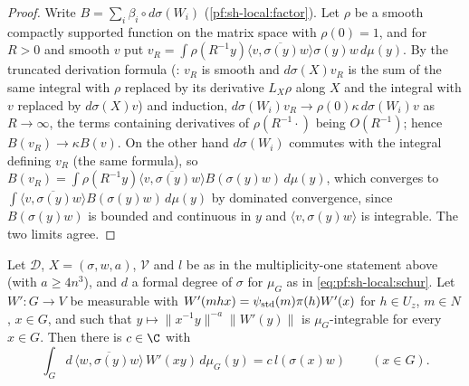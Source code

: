 \begin{proof}
Write $B=\sum_i\beta_i\circ d\sigma(W_i)$ (\cref{pf:sh-local:factor}). Let $\rho$ be a smooth compactly supported
function on the matrix space with $\rho(0)=1$, and for $R>0$ and smooth $v$ put
$v_R=\int\rho(R^{-1}y)\overline{\langle v,\sigma(y)w\rangle}\sigma(y)w\,d\mu(y)$. By the truncated derivation
formula (: $v_R$ is smooth and
$d\sigma(X)v_R$ is the sum of the same integral with $\rho$ replaced by its derivative $L_X\rho$ along $X$ and the
integral with $v$ replaced by $d\sigma(X)v$) and induction, $d\sigma(W_i)v_R\to\rho(0)\kappa\,d\sigma(W_i)v$ as
$R\to\infty$, the terms containing derivatives of $\rho(R^{-1}\cdot)$ being $O(R^{-1})$; hence
$B(v_R)\to\kappa B(v)$. On the other hand $d\sigma(W_i)$ commutes with the integral defining $v_R$ (the same
formula), so $B(v_R)=\int\rho(R^{-1}y)\overline{\langle v,\sigma(y)w\rangle}B(\sigma(y)w)\,d\mu(y)$, which converges
to $\int\overline{\langle v,\sigma(y)w\rangle}B(\sigma(y)w)\,d\mu(y)$ by dominated convergence, since
$B(\sigma(y)w)$ is bounded and continuous in $y$ and $\langle v,\sigma(y)w\rangle$ is integrable. The two limits
agree.
\end{proof}

\begin{lemma}\label{pf:sh-local:mfix}
Let $\mathcal D$, $X=(\sigma,w,a)$, $\mathcal V$ and $l$ be as in the multiplicity-one statement above (with
$a\ge4n^3$), and $d$ a formal degree of $\sigma$ for $\mu_G$ as in \eqref{eq:pf:sh-local:schur}. Let
$W':G\to V$ be measurable with $W'(mhx)=\psi_{\mathrm{std}}(m)\pi(h)W'(x)$ for $h\in U_z$, $m\in N$, $x\in G$, and such
that $y\mapsto\|x^{-1}y\|^{-a}\|W'(y)\|$ is $\mu_G$-integrable for every $x\in G$. Then there is $c\in\C$ with
\[
\int_G d\,\overline{\langle w,\sigma(y)w\rangle}\,W'(xy)\,d\mu_G(y)=c\,l(\sigma(x)w)\qquad(x\in G).
\]
\end{lemma}

